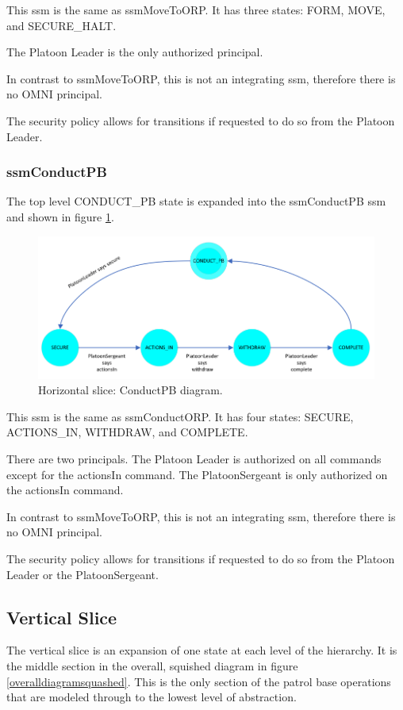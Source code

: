 \documentclass[../../main/main.tex]{subfiles}
\begin{document}
This \gls{ssm} is the same as ssmMoveToORP.  It has three states: FORM, MOVE, and SECURE_HALT.  

The Platoon Leader is the only authorized principal.  

In contrast to ssmMoveToORP, this is not an integrating \gls{ssm}, therefore there is no OMNI principal.  

The security policy allows for transitions if requested to do so from the Platoon Leader.  
\clearpage
\subsubsection{ssmConductPB}\label{sssec:ssmConductPB}
The top level CONDUCT_PB state is expanded into the ssmConductPB \gls{ssm} and shown in figure \ref{ssmConductPBDiagram}.

\begin{figure}[h!]
\centering
\includegraphics[width=\textwidth]{../figures/ssmConductPBDiagram}
\caption{\label{ssmConductPBDiagram} Horizontal slice: ConductPB diagram.}
\end{figure}

This \gls{ssm} is the same as ssmConductORP.  It has four states: SECURE, ACTIONS_IN, WITHDRAW, and COMPLETE.  

There are two principals.  The Platoon Leader is authorized on all commands except for the actionsIn command.  The PlatoonSergeant is only authorized on the actionsIn command.

In contrast to ssmMoveToORP, this is not an integrating \gls{ssm}, therefore there is no OMNI principal.  

The security policy allows for transitions if requested to do so from the Platoon Leader or the PlatoonSergeant.  


\subsection{Vertical Slice}\label{ssec:verticalslice}
The vertical slice is an expansion of one state at each level of the hierarchy.  It is the middle section in the overall, squished diagram in figure \ref{overalldiagramsquashed}.  This is the only section of the patrol base operations that are modeled through to the lowest level of abstraction.
\end{document}
